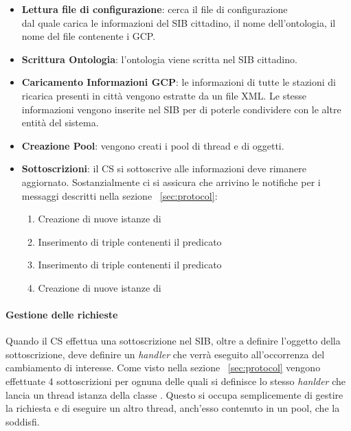 \begin{itemize}
	\item \textbf{Lettura file di configurazione}: cerca il file di configurazione \\  dal quale carica le informazioni del SIB cittadino, il nome dell'ontologia, il nome del file contenente i GCP.
	\item \textbf{Scrittura Ontologia}: l'ontologia viene scritta nel SIB cittadino.
	\item \textbf{Caricamento Informazioni GCP}: le informazioni di tutte le stazioni di ricarica presenti in città vengono estratte da un file XML. Le stesse informazioni vengono inserite nel SIB per di poterle condividere con le altre entità del sistema.
	\item \textbf{Creazione Pool}: vengono creati i pool di thread e di oggetti.
	\item \label{item:subscr} \textbf{Sottoscrizioni}: il CS si sottoscrive alle informazioni deve rimanere aggiornato. Sostanzialmente ci si assicura che arrivino le notifiche per i messaggi descritti nella sezione ~\ref{sec:protocol}:
	\begin{enumerate}
		\item Creazione di nuove istanze di 
		\item Inserimento di triple contenenti il predicato 
		\item Inserimento di triple contenenti il predicato 
		\item Creazione di nuove istanze di 
	\end{enumerate}
\end{itemize}

\paragraph{Gestione delle richieste}

Quando il CS effettua una sottoscrizione nel SIB, oltre a definire l'oggetto della sottoscrizione, deve definire un \emph{handler} che verrà eseguito all'occorrenza del cambiamento di interesse. Come visto nella sezione ~\ref{sec:protocol} vengono effettuate 4 sottoscrizioni per ognuna delle quali si definisce lo stesso \emph{hanlder} che lancia un thread istanza della classe . Questo si occupa semplicemente di gestire la richiesta e di eseguire un altro thread, anch'esso contenuto in un pool, che la soddisfi.

